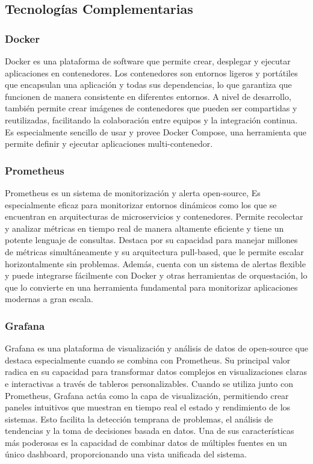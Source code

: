 \subsection{Tecnologías Complementarias}

\subsubsection{Docker}

Docker es una plataforma de software que permite crear, desplegar y ejecutar aplicaciones en contenedores. 
Los contenedores son entornos ligeros y portátiles que encapsulan una aplicación y todas sus dependencias, lo que garantiza que funcionen de manera consistente en diferentes entornos.
A nivel de desarrollo, también permite crear imágenes de contenedores que pueden ser compartidas y reutilizadas, facilitando la colaboración entre equipos y la integración continua.
Es especialmente sencillo de usar y provee Docker Compose, una herramienta que permite definir y ejecutar aplicaciones multi-contenedor.

\subsubsection{Prometheus}
Prometheus es un sistema de monitorización y alerta open-source, Es especialmente eficaz para monitorizar entornos dinámicos como los que se encuentran en arquitecturas de microservicios y contenedores.
Permite recolectar y analizar métricas en tiempo real de manera altamente eficiente y tiene un potente lenguaje de consultas. 
Destaca por su capacidad para manejar millones de métricas simultáneamente y su arquitectura pull-based, que le permite escalar horizontalmente sin problemas. 
Además, cuenta con un sistema de alertas flexible y puede integrarse fácilmente con Docker y otras herramientas de orquestación, 
lo que lo convierte en una herramienta fundamental para monitorizar aplicaciones modernas a gran escala.

\subsubsection{Grafana}
Grafana es una plataforma de visualización y análisis de datos de open-source que destaca especialmente cuando se combina con Prometheus. 
Su principal valor radica en su capacidad para transformar datos complejos en visualizaciones claras e interactivas a través de tableros personalizables.
Cuando se utiliza junto con Prometheus, Grafana actúa como la capa de visualización, permitiendo crear paneles intuitivos que muestran en tiempo real el estado y rendimiento de los sistemas. 
Esto facilita la detección temprana de problemas, el análisis de tendencias y la toma de decisiones basada en datos. 
Una de sus características más poderosas es la capacidad de combinar datos de múltiples fuentes en un único dashboard, proporcionando una vista unificada del sistema. 

\newpage